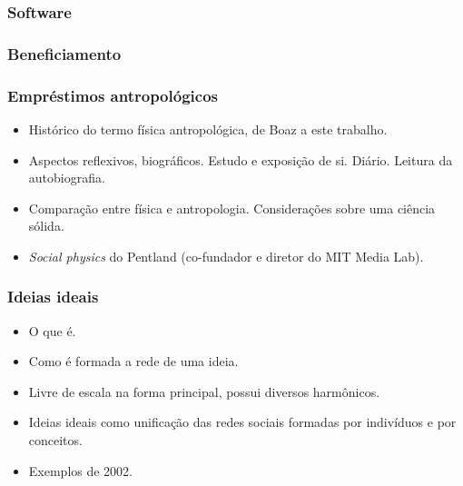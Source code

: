 \documentclass[10pt]{beamer}
\begin{document}
\begin{frame}
\frametitle{Software}
\end{frame}

\begin{frame}
\frametitle{Beneficiamento}
\end{frame}

\begin{frame}
\frametitle{Empréstimos antropológicos}
\begin{itemize}
\item Histórico do termo física antropológica, de Boaz a este trabalho.
\item Aspectos reflexivos, biográficos. Estudo e exposição de si. Diário. Leitura da autobiografia.
\item Comparação entre física e antropologia. Considerações sobre uma ciência sólida.
\item \emph{Social physics} do Pentland (co-fundador e diretor do MIT Media Lab).
\end{itemize}
\end{frame}

\begin{frame}
\frametitle{Ideias ideais}
\begin{itemize}
\item O que é.
\item Como é formada a rede de uma ideia.
\item Livre de escala na forma principal, possui diversos harmônicos.
\item Ideias ideais como unificação das redes sociais formadas por indivíduos e por conceitos.
\item Exemplos de 2002.
\end{itemize}
\end{frame}
\end{document}
